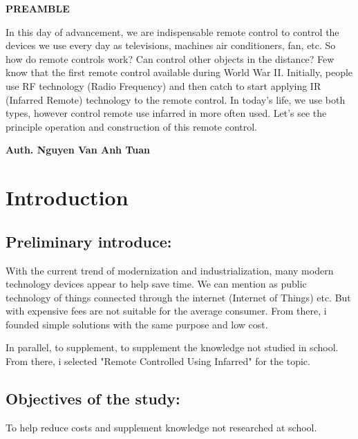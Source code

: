 \documentclass[a4paper]{report}
\begin{document}
    \newpage
    \centerline{\textbf{\huge{PREAMBLE}}} 
    \vspace{10mm}
    \begin{flushleft}
        In this day of advancement, we are indispensable remote control to control
        the devices we use every day as televisions, machines air conditioners, fan, etc.
        So how do remote controls work? Can control other objects in the distance? 
        Few know that the first remote control available during World War II. 
        Initially, people use RF technology (Radio Frequency) and then catch to start applying 
        IR (Infarred Remote) technology to the remote control. In today's life, we use 
        both types, however control remote use infarred in more often used. Let's see the principle operation 
        and construction of this remote control.
    \end{flushleft}
    \begin{flushright}
        \textbf{Auth. Nguyen Van Anh Tuan}
    \end{flushright}
    \thispagestyle{plain} %

    \newpage
    \tableofcontents

    \chapter{Introduction}
    \pagestyle{fancy}
    \raggedright %
    \section{Preliminary introduce:} 
        With the current trend of modernization and industrialization, many modern technology 
        devices appear to help save time. We can mention as public technology of things 
        connected through the internet (Internet of Things) etc. But with expensive fees 
        are not suitable for the average consumer. From there, i founded simple solutions 
        with the same purpose and low cost.
        \linebreak
        \par In parallel, to supplement, to supplement the knowledge not studied 
        in school. From there, i selected "Remote Controlled Using Infarred" for the topic.
    \section{Objectives of the study:}
        To help reduce costs and supplement knowledge not researched at school.
\end{document}
